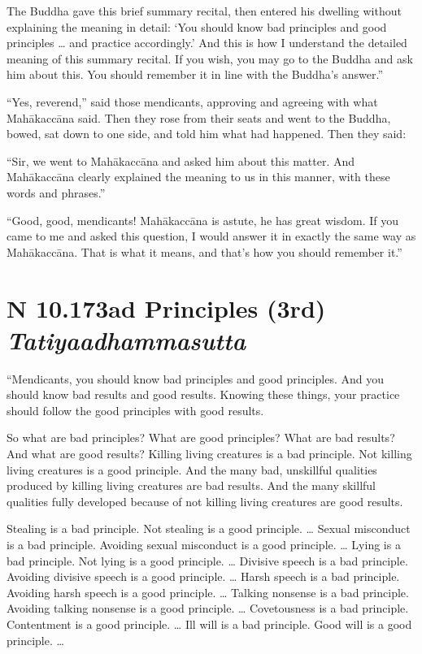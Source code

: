 \documentclass[12pt,openany]{book}%
\newcommand*{\suttatitleacronym}[1]{\smaller[2]{#1}\vspace*{.3em}}
\newcommand*{\suttatitletranslation}[1]{\linebreak{#1}}
\newcommand*{\suttatitleroot}[1]{\linebreak\smaller[2]\itshape{#1}}
\newcommand*{\tocacronym}[1]{\hspace*{-3.3em}{#1}\quad}
\newcommand*{\toctranslation}[1]{#1}
\newcommand*{\tocroot}[1]{(\textit{#1})}
\begin{document}
The Buddha gave this brief summary recital, then entered his dwelling without explaining the meaning in detail: ‘You should know bad principles and good principles … and practice accordingly.’ And this is how I understand the detailed meaning of this summary recital. If you wish, you may go to the Buddha and ask him about this. You should remember it in line with the Buddha’s answer.” 

“Yes, reverend,” said those mendicants, approving and agreeing with what \textsanskrit{Mahākaccāna} said. Then they rose from their seats and went to the Buddha, bowed, sat down to one side, and told him what had happened. Then they said: 

“Sir, we went to \textsanskrit{Mahākaccāna} and asked him about this matter. And \textsanskrit{Mahākaccāna} clearly explained the meaning to us in this manner, with these words and phrases.” 

“Good, good, mendicants! \textsanskrit{Mahākaccāna} is astute, he has great wisdom. If you came to me and asked this question, I would answer it in exactly the same way as \textsanskrit{Mahākaccāna}. That is what it means, and that’s how you should remember it.” 

%
\section*{{\suttatitleacronym AN 10.173}{\suttatitletranslation Bad Principles (3rd) }{\suttatitleroot Tatiyaadhammasutta}}
\addcontentsline{toc}{section}{\tocacronym{AN 10.173} \toctranslation{Bad Principles (3rd) } \tocroot{Tatiyaadhammasutta}}

“Mendicants, you should know bad principles and good principles. And you should know bad results and good results. Knowing these things, your practice should follow the good principles with good results. 

So what are bad principles? What are good principles? What are bad results? And what are good results? Killing living creatures is a bad principle. Not killing living creatures is a good principle. And the many bad, unskillful qualities produced by killing living creatures are bad results. And the many skillful qualities fully developed because of not killing living creatures are good results. 

Stealing is a bad principle. Not stealing is a good principle. … Sexual misconduct is a bad principle. Avoiding sexual misconduct is a good principle. … Lying is a bad principle. Not lying is a good principle. … Divisive speech is a bad principle. Avoiding divisive speech is a good principle. … Harsh speech is a bad principle. Avoiding harsh speech is a good principle. … Talking nonsense is a bad principle. Avoiding talking nonsense is a good principle. … Covetousness is a bad principle. Contentment is a good principle. … Ill will is a bad principle. Good will is a good principle. … 
\end{document}
